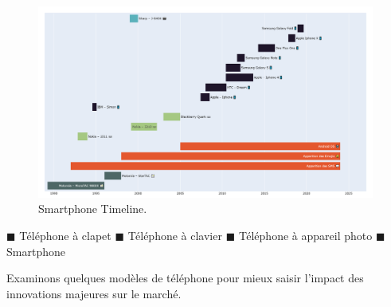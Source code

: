 \documentclass[
  12pt,
]{report}
\begin{document}
\begin{figure}[htbp]
    \centering
    \includegraphics[width=0.99\textwidth]{imgs/smartphones_timeline.png}
    \caption{Smartphone Timeline.}
    \label{fig:smartphones}
\end{figure}

\textcolor{colgraph1}{$\blacksquare$} Téléphone à clapet
\textcolor{colgraph2}{$\blacksquare$} Téléphone à clavier
\textcolor{colgraph3}{$\blacksquare$} Téléphone à appareil photo
\(\blacksquare\) Smartphone

Examinons quelques modèles de téléphone pour mieux saisir l'impact des
innovations majeures sur le marché.
\end{document}
